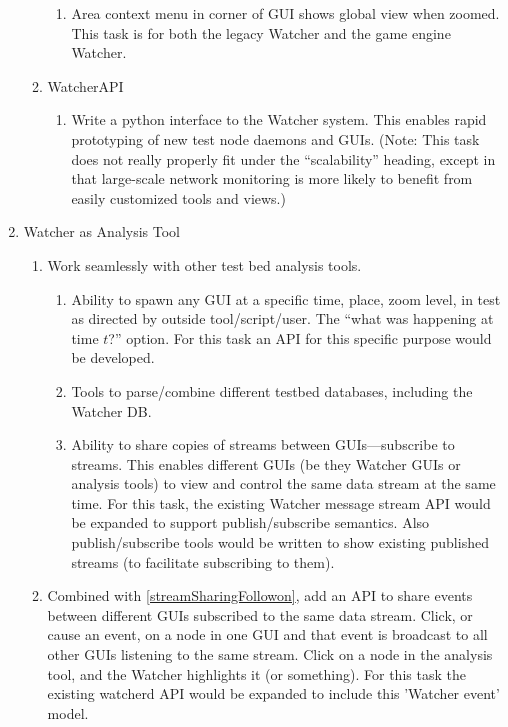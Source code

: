 \documentclass{report}
\begin{document}
\begin{enumerate}
\begin{enumerate}
\begin{enumerate}
        \item Area context menu in corner of GUI shows global view when zoomed. This task is for both the legacy Watcher and the game engine Watcher. 
    \end{enumerate}
    \item WatcherAPI
    \begin{enumerate}
        \item Write a python interface to the Watcher system. This enables rapid prototyping of new test node daemons and GUIs. (Note: This task does not really properly fit under the ``scalability'' heading, except in that large-scale network monitoring is more likely to benefit from easily customized tools and views.)
    \end{enumerate}
\end{enumerate}
\item Watcher as Analysis Tool 
    \begin{enumerate}
    \item Work seamlessly with other test bed analysis tools.
        \begin{enumerate}
            \item Ability to spawn any GUI at a specific time, place, zoom level, in test as directed by outside tool\slash script\slash user. The ``what was happening at time $t$?'' option. For this task an API for this specific purpose would be developed.  
            \item Tools to parse\slash combine different testbed databases, including the Watcher DB.
            \item Ability to share copies of streams between GUIs---subscribe to streams. This enables different GUIs (be they Watcher GUIs or analysis tools) to view and control the same data stream at the same time. For this task, the existing Watcher message stream API would be expanded to support publish\slash subscribe semantics. Also publish\slash subscribe tools would be written to show existing published streams (to facilitate subscribing to them).
            \label{streamSharingFollowon}
        \end{enumerate}
        \item Combined with \ref{streamSharingFollowon}, add an API to share events between different GUIs subscribed to the same data stream. Click, or cause an event, on a node in one GUI and that event is broadcast to all other GUIs listening to the same stream. Click on a node in the analysis tool, and the Watcher highlights it (or something). For this task the existing watcherd API would be expanded to include this 'Watcher event' model.

\end{enumerate}
\end{enumerate}
\end{document}
